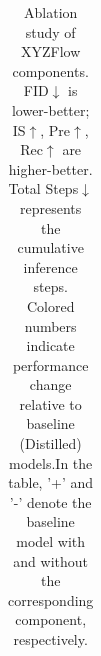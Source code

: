 \documentclass{article}
\theoremstyle{plain}
\theoremstyle{definition}
\theoremstyle{remark}
\begin{document}
\begin{table}[ht]
\begin{tabular}{@{}lccccccc@{}}
\bottomrule
\end{tabular}
\caption{Ablation study of XYZFlow components. FID$\downarrow$ is lower-better; IS$\uparrow$, Pre$\uparrow$, Rec$\uparrow$ are higher-better. Total Steps$\downarrow$ represents the cumulative inference steps. Colored numbers indicate performance change relative to baseline (Distilled) models.In the table, '+' and '-' denote the baseline model with and without the corresponding component, respectively.}
\label{tab:ablation}
\vspace{-7mm}
\end{table}








\end{document}
